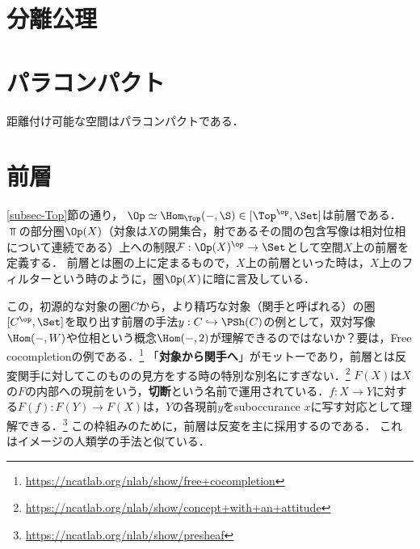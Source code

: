 \documentclass[uplatex,dvipdfmx]{jsreport}
\begin{document}
\section{分離公理}

\section{パラコンパクト}

\begin{tcolorbox}[colframe=ForestGreen, colback=ForestGreen!10!white,breakable,colbacktitle=ForestGreen!40!white,coltitle=black,fonttitle=\bfseries\sffamily,
title=]
    距離付け可能な空間はパラコンパクトである．
\end{tcolorbox}

\section{前層}

\begin{screen}
    \ref{subsec-Top}節の通り，
    $\Op\simeq\Hom_\Top(-,\S)\in[\Top^\op,\Set]$は前層である．
    $\Top$の部分圏$\Op(X)$（対象は$X$の開集合，射であるその間の包含写像は相対位相について連続である）上への制限$\mathcal{F}:\Op(X)^\op\to\Set$として空間$X$上の前層を定義する．
    前層とは圏の上に定まるもので，$X$上の前層といった時は，$X$上のフィルターという時のように，圏$\Op(X)$に暗に言及している．

    この，初源的な対象の圏$C$から，より精巧な対象（関手と呼ばれる）の圏$[C^\op,\Set]$を取り出す前層の手法$y:C\hookrightarrow\PSh(C)$の例として，双対写像$\Hom(-,W)$や位相という概念$\Hom(-,2)$が理解できるのではないか？要は，Free cocompletionの例である．\footnote{\url{https://ncatlab.org/nlab/show/free+cocompletion}}
    「\textbf{対象から関手へ}」がモットーであり，前層とは反変関手に対してこのものの見方をする時の特別な別名にすぎない．\footnote{\url{https://ncatlab.org/nlab/show/concept+with+an+attitude}}
    $F(X)$は$X$の$F$の内部への現前をいう，\textbf{切断}という名前で運用されている．$f:X\to Y$に対する$F(f):F(Y)\to F(X)$は，$Y$の各現前$y$をsuboccurance $x$に写す対応として理解できる．\footnote{\url{https://ncatlab.org/nlab/show/presheaf}}
    この枠組みのために，前層は反変を主に採用するのである．
    これはイメージの人類学の手法と似ている．
\end{screen}
\end{document}
